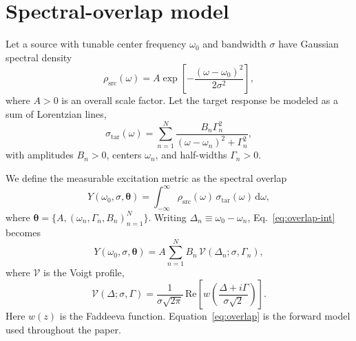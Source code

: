 \documentclass[aps,pre,amsmath,amssymb]{revtex4-2}
\begin{document}
\section{Spectral-overlap model}
Let a source with tunable center frequency $\omega_0$ and bandwidth $\sigma$ have Gaussian spectral density
\begin{equation}
\rho_{\mathrm{src}}(\omega)=A\exp\!\left[-\frac{(\omega-\omega_0)^2}{2\sigma^2}\right],
\label{eq:src}
\end{equation}
where $A>0$ is an overall scale factor. Let the target response be modeled as a sum of Lorentzian lines,
\begin{equation}
\sigma_{\mathrm{tar}}(\omega)=\sum_{n=1}^{N}\frac{B_n\Gamma_n^2}{(\omega-\omega_n)^2+\Gamma_n^2},
\label{eq:tar}
\end{equation}
with amplitudes $B_n>0$, centers $\omega_n$, and half-widths $\Gamma_n>0$.

We define the measurable excitation metric as the spectral overlap
\begin{equation}
Y(\omega_0,\sigma,\bm{\theta})
=\int_{-\infty}^{\infty}\rho_{\mathrm{src}}(\omega)\,\sigma_{\mathrm{tar}}(\omega)\,\mathrm d\omega,
\label{eq:overlap-int}
\end{equation}
where $\bm{\theta}=\{A,(\omega_n,\Gamma_n,B_n)_{n=1}^{N}\}$. Writing $\Delta_n\equiv \omega_0-\omega_n$, Eq.~\eqref{eq:overlap-int} becomes
\begin{equation}
Y(\omega_0,\sigma,\bm{\theta})
=A\sum_{n=1}^{N}B_n\,\mathcal V(\Delta_n;\sigma,\Gamma_n),
\label{eq:overlap}
\end{equation}
where $\mathcal V$ is the Voigt profile,
\begin{equation}
\mathcal V(\Delta;\sigma,\Gamma)
=\frac{1}{\sigma\sqrt{2\pi}}\,\mathrm{Re}\!\left[w\!\left(\frac{\Delta+i\Gamma}{\sigma\sqrt{2}}\right)\right].
\label{eq:voigt}
\end{equation}
Here $w(z)$ is the Faddeeva function. Equation~\eqref{eq:overlap} is the forward model used throughout the paper.
\end{document}
